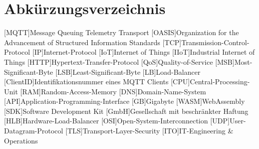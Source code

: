 

\section*{Abkürzungsverzeichnis}
\begin{acronym}[xxxxxxxxxx] %
    [MQTT]{Message Queuing Telemetry Transport}
    [OASIS]{Organization for the Advancement of Structured Information Standards}
    [TCP]{Transmission-Control-Protocol}
    [IP]{Internet-Protocol}
    [IoT]{Internet of Things}
    [IIoT]{Industrial Internet of Things}
    [HTTP]{Hypertext-Transfer-Protocol}
    [QoS]{Quality-of-Service}
    [MSB]{Most-Significant-Byte}
    [LSB]{Least-Significant-Byte}
    [LB]{Load-Balancer}
    [ClientID]{Identifikationsnummer eines MQTT Clients}
    [CPU]{Central-Processing-Unit}
    [RAM]{Random-Access-Memory}
    [DNS]{Domain-Name-System}
    [API]{Application-Programming-Interface}
    [GB]{Gigabyte}
    [WASM]{WebAssembly}
    [SDK]{Software Development Kit}
    [GmbH]{Gesellschaft mit beschränkter Haftung}
    [HLB]{Hardware-Load-Balancer}
    [OSI]{Open-System-Interconnection}
    [UDP]{User-Datagram-Protocol}
    [TLS]{Transport-Layer-Security}
    [ITO]{IT-Engineering \& Operations}
\end{acronym}
